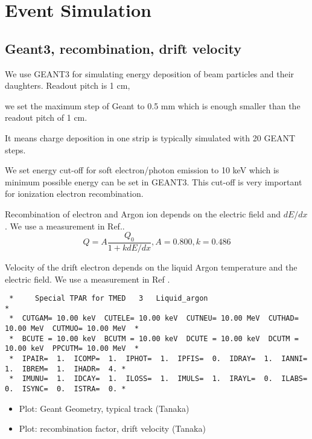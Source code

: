 \section{Event Simulation}
\subsection{Geant3, recombination, drift velocity}

We use GEANT3 for simulating energy deposition of beam particles and
their daughters. Readout pitch is 1 cm, 

we set the maximum step of Geant to 0.5 mm
which is enough smaller than the readout pitch of 1 cm.

It means charge deposition in one strip is typically 
simulated with 20 GEANT steps.

We set energy cut-off for soft electron/photon emission to
10 keV which is minimum possible energy can be set in GEANT3.
This cut-off is very important for  ionization electron recombination.

Recombination of electron and Argon ion depends on
the electric field and $dE/dx$. We use a measurement in Ref.\cite{658352}.
\begin{equation}
Q = A \frac{Q_0}{1 + k dE/dx}, A = 0.800, k = 0.486
\end{equation}

Velocity of the drift electron depends on the liquid Argon temperature
and the electric field. We use a measurement in Ref \cite{649233}.


\begin{verbatim}
 *     Special TPAR for TMED   3   Liquid_argon                                                    *
 *  CUTGAM= 10.00 keV  CUTELE= 10.00 keV  CUTNEU= 10.00 MeV  CUTHAD= 10.00 MeV  CUTMUO= 10.00 MeV  *
 *  BCUTE = 10.00 keV  BCUTM = 10.00 keV  DCUTE = 10.00 keV  DCUTM = 10.00 keV  PPCUTM= 10.00 MeV  *
 *  IPAIR=  1.  ICOMP=  1.  IPHOT=  1.  IPFIS=  0.  IDRAY=  1.  IANNI=  1.  IBREM=  1.  IHADR=  4. *
 *  IMUNU=  1.  IDCAY=  1.  ILOSS=  1.  IMULS=  1.  IRAYL=  0.  ILABS=  0.  ISYNC=  0.  ISTRA=  0. *
\end{verbatim}



\begin{itemize}
\item Plot: Geant Geometry, typical track (Tanaka)
\item Plot: recombination factor, drift velocity  (Tanaka)
\end{itemize}

